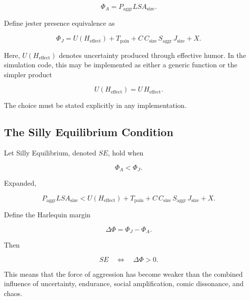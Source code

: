 \documentclass[11pt]{article}
\begin{document}
\begin{equation}
\Phi_A
=
P_{\mathrm{aggr}}
L
S
A_{\mathrm{size}}.
\label{eq:phi-a}
\end{equation}

Define jester presence equivalence as

\begin{equation}
\Phi_J
=
U(H_{\mathrm{effect}})
+
T_{\mathrm{pain}}
+
C\,C_{\mathrm{size}}\,S_{\mathrm{aggr}}\,J_{\mathrm{size}}
+
X.
\label{eq:phi-j}
\end{equation}

Here, $U(H_{\mathrm{effect}})$ denotes uncertainty produced through effective humor. In the simulation code, this may be implemented as either a generic function or the simpler product

\begin{equation}
U(H_{\mathrm{effect}})
=
U\,H_{\mathrm{effect}}.
\label{eq:u-h-product}
\end{equation}

The choice must be stated explicitly in any implementation.

\subsection{The Silly Equilibrium Condition}

Let Silly Equilibrium, denoted $SE$, hold when

\begin{equation}
\Phi_A < \Phi_J.
\label{eq:se-compact}
\end{equation}

Expanded,

\begin{equation}
P_{\mathrm{aggr}}LSA_{\mathrm{size}}
<
U(H_{\mathrm{effect}})
+
T_{\mathrm{pain}}
+
C\,C_{\mathrm{size}}\,S_{\mathrm{aggr}}\,J_{\mathrm{size}}
+
X.
\label{eq:se-expanded}
\end{equation}

Define the Harlequin margin

\begin{equation}
\Delta\Phi
=
\Phi_J-\Phi_A.
\label{eq:delta-phi}
\end{equation}

Then

\begin{equation}
SE
\quad\Longleftrightarrow\quad
\Delta\Phi>0.
\label{eq:se-margin}
\end{equation}

This means that the force of aggression has become weaker than the combined influence of uncertainty, endurance, social amplification, comic dissonance, and chaos.
\end{document}
